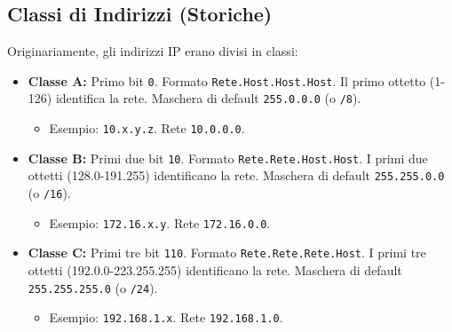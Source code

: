 \subsection{Classi di Indirizzi (Storiche)}
Originariamente, gli indirizzi IP erano divisi in classi:
\begin{itemize}
    \item \textbf{Classe A:} Primo bit \texttt{0}. Formato \texttt{Rete.Host.Host.Host}. Il primo ottetto (1-126) identifica la rete. Maschera di default \texttt{255.0.0.0} (o \texttt{/8}).
    \begin{itemize}
        \item Esempio: \texttt{10.x.y.z}. Rete \texttt{10.0.0.0}.
    \end{itemize}
    \item \textbf{Classe B:} Primi due bit \texttt{10}. Formato \texttt{Rete.Rete.Host.Host}. I primi due ottetti (128.0-191.255) identificano la rete. Maschera di default \texttt{255.255.0.0} (o \texttt{/16}).
    \begin{itemize}
        \item Esempio: \texttt{172.16.x.y}. Rete \texttt{172.16.0.0}.
    \end{itemize}
    \item \textbf{Classe C:} Primi tre bit \texttt{110}. Formato \texttt{Rete.Rete.Rete.Host}. I primi tre ottetti (192.0.0-223.255.255) identificano la rete. Maschera di default \texttt{255.255.255.0} (o \texttt{/24}).
    \begin{itemize}
        \item Esempio: \texttt{192.168.1.x}. Rete \texttt{192.168.1.0}.
    \end{itemize}
\end{itemize}

